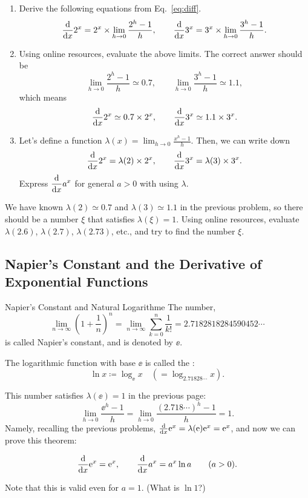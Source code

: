\documentclass[11pt,pdfa,lastpage]{MishoNote}
\begin{document}
\ornamentskip

\begin{enumerate}[resume]
 \itemB
 \begin{enumerate}
  \item Derive the following equations from Eq.~\eqref{eq:diff}.
\[
  \diff{}{x}2^x = 2^x\times\lim_{h\to 0}\frac{2^h-1}{h},\qquad
  \diff{}{x}3^x = 3^x\times\lim_{h\to 0}\frac{3^h-1}{h}.
\]
\item Using online resources, evaluate the above limits. The correct answer should be
\[
  \lim_{h\to 0}\frac{2^h-1}{h}\simeq0.7, \qquad \lim_{h\to 0}\frac{3^h-1}{h}\simeq1.1,
\]
which means
\[
  \diff{}{x}2^x \simeq 0.7\times2^x,\qquad
  \diff{}{x}3^x \simeq 1.1\times3^x.
\]
\item Let's define a function $\displaystyle\lambda(x)=\lim_{h\to 0}\frac{x^h-1}{h}$. Then, we can write down
\[
  \diff{}{x}2^x = \lambda(2)\times2^x,\qquad
  \diff{}{x}3^x = \lambda(3)\times3^x.
\]
Express $\displaystyle\diff{}{x}a^x$ for general $a>0$ with using $\lambda$.
\end{enumerate}
\itemC We have known $\lambda(2)\simeq 0.7$ and $\lambda(3)\simeq 1.1$ in the previous problem, so there should be a number $\xi$ that satisfies $\lambda(\xi)=1$.
Using online resources, evaluate $\lambda(2.6)$, $\lambda(2.7)$, $\lambda(2.73)$, etc., and try to find the number $\xi$.
\end{enumerate}

\newpage
\subsection{Napier's Constant and the Derivative of Exponential Functions}
\begin{definition}{Napier's Constant and Natural Logarithm}{e}
The number,
\begin{equation}
  \lim_{n\to\infty}\left(1+\frac{1}n\right)^n=\lim_{n\to\infty}\sum_{k=0}^n\frac{1}{k!}=2.7182818284590452\cdots\label{eq:napier}
\end{equation}
is called Napier's constant, and is denoted by $\ee$.

The logarithmic function with base $\ee$ is called the :
\[
  \ln x \coloneq \log_{\ee} x \quad(=\log_{2.71828\cdots}x).
\]
\end{definition}
This number satisfies $\lambda(\ee)=1$ in the previous page:
\[
  \lim_{h\to 0}\frac{\ee^h-1}{h}= \lim_{h\to 0}\frac{(2.718\cdots)^h-1}{h}=1.
\]
Namely, recalling the previous problems,
$ \diff{}{x}\ee^x=\lambda(\ee)\ee^x=\ee^x$, and now
we can prove this theorem:
\begin{theorem}{}{}
  \begin{equation}
      \diff{}x{\ee^x}=\ee^x,\qquad
      \diff{}x{a^x}=a^x\ln a\qquad(a>0).
  \end{equation}
\end{theorem}
Note that this is valid even for $a=1$. (What is $\ln 1$?)
\end{document}

